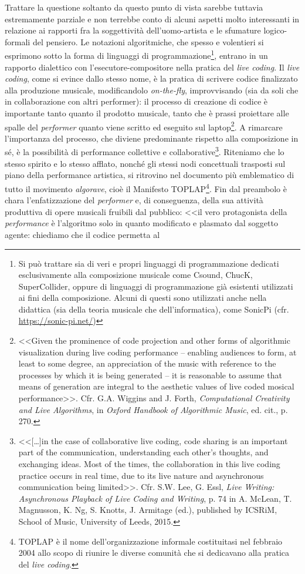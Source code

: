 \documentclass[a4paper,12pt]{scrartcl}
\newcommand{\omissis}{[\dots\unkern]}
\begin{document}
	Trattare la questione soltanto da questo punto di vista sarebbe tuttavia estremamente parziale e non terrebbe conto di alcuni aspetti molto interessanti in relazione ai rapporti fra la soggettività dell'uomo-artista e le sfumature logico-formali del pensiero. Le notazioni algoritmiche, che spesso e volentieri si esprimono sotto la forma di linguaggi di programmazione\footnote{Si può trattare sia di veri e propri linguaggi di programmazione dedicati esclusivamente alla composizione musicale come Csound, ChucK, SuperCollider, oppure di linguaggi di programmazione già esistenti utilizzati ai fini della composizione. Alcuni di questi sono utilizzati anche nella didattica (sia della teoria musicale che dell'informatica), come  SonicPi (cfr. \url{https://sonic-pi.net/})}, entrano in un rapporto dialettico con l'esecutore-compositore nella pratica del \emph{live coding}. Il \emph{live coding}, come si evince dallo stesso nome, è la pratica di scrivere codice finalizzato alla produzione musicale, modificandolo \emph{on-the-fly}, improvvisando (sia da soli che in collaborazione con altri performer): il processo di creazione di codice è importante tanto quanto il prodotto musicale, tanto che è prassi proiettare alle spalle del \textit{performer} quanto viene scritto ed eseguito sul laptop\footnote{<<Given the prominence of code projection and other forms of algorithmic visualization during live coding performance -- enabling audiences to form, at least to some degree, an appreciation of the music with reference to the processes by which it is being generated -- it is reasonable to assume that means of generation are integral to the aesthetic values of live coded mosical performance>>. Cfr. G.A. Wiggins and J. Forth, \textit{Computational Creativity and Live Algorithms}, in \textit{Oxford Handbook of Algorithmic Music}, ed. cit., p. 270.}. A rimarcare l'importanza del processo, che diviene predominante rispetto alla composizione in sé, è la possibilità di performance collettive e collaborative\footnote{<<\omissis in the case of collaborative live coding, code sharing is an important part of the communication, understanding each other's thoughts, and exchanging ideas. Most of the times, the collaboration in this live coding practice occurs in real time, due to its live nature and asynchronous communication being limited>>. Cfr. S.W. Lee, G. Essl, \textit{Live Writing: Asynchronous Playback of Live Coding and Writing}, p. 74 in A. McLean, T. Magnusson, K. Ng, S. Knotts, J. Armitage (ed.), published by ICSRiM, School of Music, University of Leeds, 2015.}. Riteniamo che lo stesso spirito e lo stesso afflato, nonché gli stessi nodi concettuali trasposti sul piano della performance artistica, si ritrovino nel documento più emblematico di tutto il movimento \emph{algorave}, cioè il Manifesto TOPLAP\footnote{TOPLAP è il nome dell'organizzazione informale costituitasi nel febbraio 2004 allo scopo di riunire le diverse comunità che si dedicavano alla pratica del \emph{live coding}.}. Fin dal preambolo è chara l'enfatizzazione del \emph{performer} e, di conseguenza, della sua attività produttiva di opere musicali fruibili dal pubblico: <<il vero protagonista della \emph{performance} è l'algoritmo solo in quanto modificato e plasmato dal soggetto agente: chiediamo che il codice permetta al 
\end{document}
